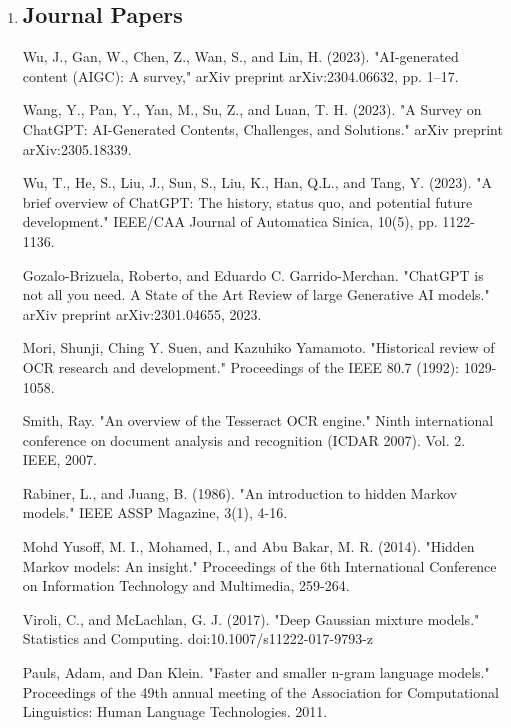 \documentclass[fleqn,10pt]{thescipub} %
\begin{document}

\begin{enumerate}
\item \subsection{Journal Papers}
Wu, J., Gan, W., Chen, Z., Wan, S., and Lin, H. (2023). "AI-generated content (AIGC): A survey," arXiv preprint arXiv:2304.06632, pp. 1–17.

Wang, Y., Pan, Y., Yan, M., Su, Z., and Luan, T. H. (2023). "A Survey on ChatGPT: AI-Generated Contents, Challenges, and Solutions." arXiv preprint arXiv:2305.18339.

Wu, T., He, S., Liu, J., Sun, S., Liu, K., Han, Q.L., and Tang, Y. (2023). "A brief overview of ChatGPT: The history, status quo, and potential future development." IEEE/CAA Journal of Automatica Sinica, 10(5), pp. 1122-1136.

Gozalo-Brizuela, Roberto, and Eduardo C. Garrido-Merchan. "ChatGPT is not all you need. A State of the Art Review of large Generative AI models." arXiv preprint arXiv:2301.04655, 2023.

Mori, Shunji, Ching Y. Suen, and Kazuhiko Yamamoto. "Historical review of OCR research and development." Proceedings of the IEEE 80.7 (1992): 1029-1058.

Smith, Ray. "An overview of the Tesseract OCR engine." Ninth international conference on document analysis and recognition (ICDAR 2007). Vol. 2. IEEE, 2007.

Rabiner, L., and Juang, B. (1986). "An introduction to hidden Markov models." IEEE ASSP Magazine, 3(1), 4-16.

Mohd Yusoff, M. I., Mohamed, I., and Abu Bakar, M. R. (2014). "Hidden Markov models: An insight." Proceedings of the 6th International Conference on Information Technology and Multimedia, 259-264.

Viroli, C., and McLachlan, G. J. (2017). "Deep Gaussian mixture models." Statistics and Computing. doi:10.1007/s11222-017-9793-z

Pauls, Adam, and Dan Klein. "Faster and smaller n-gram language models." Proceedings of the 49th annual meeting of the Association for Computational Linguistics: Human Language Technologies. 2011.


\end{enumerate}
\end{document}
